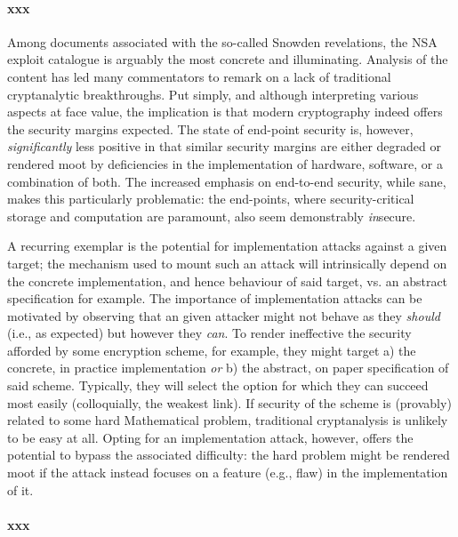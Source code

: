 
\paragraph{xxx}

Among documents associated with the so-called Snowden revelations, the NSA 
exploit catalogue is arguably the most concrete and illuminating.  Analysis
of the content has led many commentators to remark on a lack of traditional
cryptanalytic breakthroughs.  Put simply, and although interpreting various
aspects at face value, the implication is that modern cryptography indeed
offers the security margins expected.  The state of end-point security is, 
however, {\em significantly} less positive in that similar security margins
are either degraded or rendered moot by deficiencies in the implementation 
of hardware, software, or a combination of both.  The increased emphasis on
end-to-end security, while sane, makes this particularly problematic: the
end-points, where security-critical storage and computation are paramount,
also seem demonstrably {\em in}secure.

A recurring exemplar is the potential for implementation attacks against a
given target; the mechanism used to mount such an attack will intrinsically
depend on the concrete implementation, and hence behaviour of said target,
vs. an abstract specification for example.
The importance of implementation attacks can be motivated by observing that
an given attacker might not behave as they {\em should} (i.e., as expected)
but however they {\em can}.  To render ineffective the security afforded by
some encryption scheme, for example, they might target
a) the concrete, in practice implementation
   {\em or}
b) the abstract, on paper    specification
of said scheme.  Typically, they will select the option for which they can
succeed most easily (colloquially, the weakest link).  If security of the
scheme is (provably) related to some hard Mathematical problem, traditional
cryptanalysis is unlikely to be easy at all.  Opting for an implementation
attack, however, offers the potential to bypass the associated difficulty:
the hard problem might be rendered moot if the attack instead focuses on a
feature (e.g., flaw) in the implementation of it.


\paragraph{xxx}

